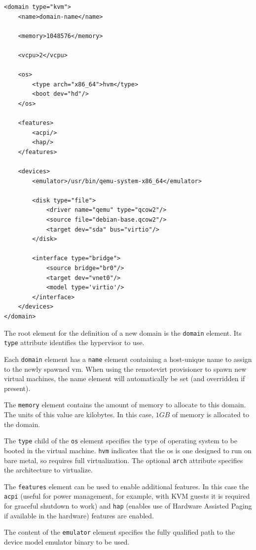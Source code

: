 \lstset{language=xml,caption=Basic libvirt XML description file,label=lst:libvirtxml}
\begin{lstlisting}
<domain type="kvm">
	<name>domain-name</name>

	<memory>1048576</memory>

	<vcpu>2</vcpu>

	<os>
		<type arch="x86_64">hvm</type>
		<boot dev="hd"/>
	</os>

	<features>
		<acpi/>
		<hap/>
	</features>

	<devices>
		<emulator>/usr/bin/qemu-system-x86_64</emulator>

		<disk type="file">
			<driver name="qemu" type="qcow2"/>
			<source file="debian-base.qcow2"/>
			<target dev="sda" bus="virtio"/>
		</disk>

		<interface type="bridge">
			<source bridge="br0"/>
			<target dev="vnet0"/>
			<model type='virtio'/>
		</interface>
	</devices>
</domain>
\end{lstlisting}

The root element for the definition of a new domain is the \texttt{domain} element. Its \texttt{type} attribute identifies the hypervisor to use.

Each \texttt{domain} element has a \texttt{name} element containing a host-unique name to assign to the newly spawned \gls{vm}. When using the remotevirt provisioner to spawn new virtual machines, the name element will automatically be set (and overridden if present).

The \texttt{memory} element contains the amount of memory to allocate to this domain. The units of this value are kilobytes. In this case, $1GB$ of memory is allocated to the domain.

The \texttt{type} child of the \texttt{os} element specifies the type of operating system to be booted in the virtual machine. \texttt{hvm} indicates that the \gls{os} is one designed to run on bare metal, so requires full virtualization. The optional \texttt{arch} attribute specifies the  architecture to virtualize.

The \texttt{features} element can be used to enable additional features. In this case the \texttt{acpi} (useful for power management, for example, with KVM guests it is required for graceful shutdown to work) and \texttt{hap} (enables use of Hardware Assisted Paging if available in the hardware) features are enabled.

The content of the \texttt{emulator} element specifies the fully qualified path to the device model emulator binary to be used.


